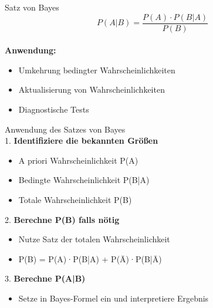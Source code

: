 
\begin{theorem}{Satz von Bayes}
    \vspace{-4mm}\\
$$P(A|B)=\frac{P(A) \cdot P(B|A)}{P(B)}$$
\vspace{-4mm}\\
\textbf{Anwendung:}
\begin{itemize}
    \item Umkehrung bedingter Wahrscheinlichkeiten
    \item Aktualisierung von Wahrscheinlichkeiten
    \item Diagnostische Tests
\end{itemize}
\end{theorem}


\begin{KR}{Anwendung des Satzes von Bayes}\\
1. \textbf{Identifiziere die bekannten Größen}
   \begin{itemize}
   \item A priori Wahrscheinlichkeit P(A)
   \item Bedingte Wahrscheinlichkeit P(B|A)
   \item Totale Wahrscheinlichkeit P(B)
   \end{itemize}

2. \textbf{Berechne P(B) falls nötig}
   \begin{itemize}
   \item Nutze Satz der totalen Wahrscheinlichkeit
   \item P(B) = P(A)·P(B|A) + P(Ā)·P(B|Ā)
   \end{itemize}

3. \textbf{Berechne P(A|B)}
   \begin{itemize}
   \item Setze in Bayes-Formel ein und interpretiere Ergebnis
   \end{itemize}
\end{KR}

